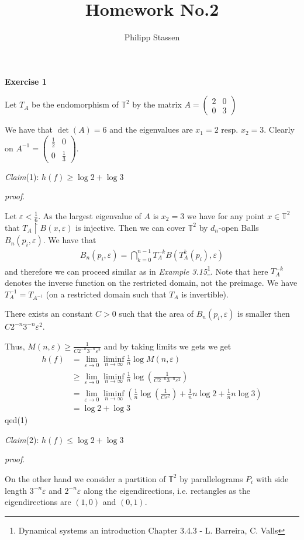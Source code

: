 \documentclass{article}
\title{Homework No.2}
\author{Philipp Stassen}
\newcommand{\T}[1]{\mathbb{T}^{#1}}
\newcommand{\subclaim}[1]
{

	\vspace*{0,2cm}
	\textit{Claim}({#1}):
}
\newcommand{\subqed}[1]{\hfill\textsf{qed}({#1})}
\newcommand{\subproof}{

\noindent\textit{proof}.\hspace{0,1cm}
}
\newcommand{\aufgabe}[1]{
{
	\vspace*{0.5cm}
	\noindent\textsf{\textbf{Exercise #1}}
	\vspace*{0.2cm}

}
}
\theoremstyle{definition}
\theoremstyle{plain}
\theoremstyle{remark}
\begin{document}
\maketitle
\aufgabe1 Let $T_A$ be the endomorphism of $\T2$ by the matrix $A = 
\begin{pmatrix}
	2 &0 \\
	0 &3
\end{pmatrix}$

We have that $\det(A) = 6$ and the eigenvalues are $x_1 = 2$ resp. $x_2= 3$. Clearly on $A^{-1} = 
\begin{pmatrix}
	\frac{1}{2} &0\\
	0&\frac{1}{3}
\end{pmatrix}$.

\subclaim1 $h(f)\geq \log2+\log3$
\subproof
Let $\varepsilon < \frac{1}{6}$. As the largest eigenvalue of $A$ is $x_2 = 3$ we have for any point $x\in \T2$ that $T_A\upharpoonright B(x,\varepsilon)$ is injective.
Then we can cover $\T2$ by $d_n$-open Balls $B_n(p_i,\varepsilon)$. We have that
\begin{align}
	B_n(p_i,\varepsilon) = \bigcap_{k=0}^{n-1}T_{A}^{-k}B(T_{A}^k(p_i),\varepsilon)
\end{align}
and therefore we can proceed similar as in \emph{Example 3.15}\footnote{Dynamical systems an introduction Chapter 3.4.3 - L. Barreira, C. Valls}. Note that here $T_A^{-k}$ denotes the inverse function on the restricted domain, not the preimage. We have $T_A^{-1}=T_{A^{-1}}$ (on a restricted domain such that $T_A$ is invertible).

There exists an constant $C>0$ such that the area of $B_n(p_i,\varepsilon)$ is smaller then $C 2^{-n}3^{-n}\varepsilon^2$. 

Thus, $M(n,\varepsilon)\geq \frac{1}{C 2^{-n}3^{-n}\varepsilon^2}$ and by taking limits we gets we get
\begin{align}
	h(f)&=\lim_{\varepsilon\to 0}\liminf_{n\to\infty}\frac{1}{n}\log M(n,\varepsilon)\\
	&\geq \lim_{\varepsilon\to 0}\liminf_{n\to\infty}\frac{1}{n}\log \left(\frac{1}{C 2^{-n}3^{-n}\varepsilon^2}\right)\\
										  &=\lim_{\varepsilon\to 0}\liminf_{n\to\infty}\left(\frac{1}{n}\log \left(\frac{1}{C \varepsilon^2}\right)+\frac{1}{n}n\log2+\frac{1}{n}n\log3\right) \\
	&=\log2+\log3
\end{align}
\subqed1
\subclaim2 $h(f)\leq \log2+\log3$
\subproof
On the other hand we consider a partition of $\T2$ by parallelograms $P_i$ with side length $3^{-n}\varepsilon$ and $2^{-n}\varepsilon$ along the eigendirections, i.e. rectangles as the eigendirections are $(1,0)$ and $(0,1)$. 
\end{document}
